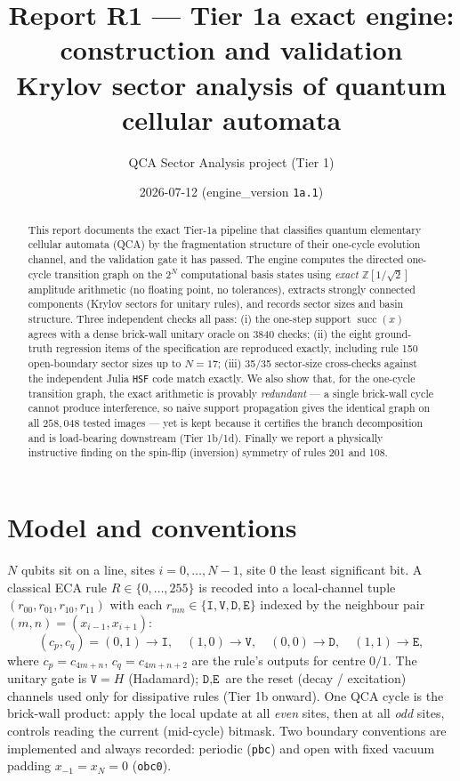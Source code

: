 \documentclass[11pt]{article}
\title{\textbf{Report R1 --- Tier 1a exact engine: construction and validation}\\
\large Krylov sector analysis of quantum cellular automata}
\author{QCA Sector Analysis project (Tier 1)}
\date{2026-07-12 \quad\small(engine\_version \texttt{1a.1})}
\newcommand{\rt}[1]{\texttt{#1}}
\newcommand{\Zsqrt}{\ensuremath{\mathbb{Z}[1/\sqrt{2}]}}
\begin{document}
\maketitle

\begin{abstract}
This report documents the exact Tier-1a pipeline that classifies quantum
elementary cellular automata (QCA) by the fragmentation structure of their
one-cycle evolution channel, and the validation gate it has passed. The engine
computes the directed one-cycle transition graph on the $2^N$ computational
basis states using \emph{exact} \Zsqrt{} amplitude arithmetic (no floating point,
no tolerances), extracts strongly connected components (Krylov sectors for
unitary rules), and records sector sizes and basin structure. Three independent
checks all pass: (i) the one-step support $\operatorname{succ}(x)$ agrees with a
dense brick-wall unitary oracle on 3840 checks; (ii) the eight ground-truth
regression items of the specification are reproduced exactly, including rule 150
open-boundary sector sizes up to $N=17$; (iii) 35/35 sector-size cross-checks
against the independent Julia \rt{HSF} code match exactly. We also show that, for the one-cycle transition
graph, the exact arithmetic is provably \emph{redundant} --- a single brick-wall
cycle cannot produce interference, so naive support propagation gives the
identical graph on all $258{,}048$ tested images --- yet is kept because it
certifies the branch decomposition and is load-bearing downstream (Tier 1b/1d).
Finally we report a physically instructive finding on the spin-flip (inversion)
symmetry of rules 201 and 108.
\end{abstract}

\section{Model and conventions}
$N$ qubits sit on a line, sites $i=0,\dots,N-1$, site $0$ the least significant
bit. A classical ECA rule $R\in\{0,\dots,255\}$ is recoded into a local-channel
tuple $(r_{00},r_{01},r_{10},r_{11})$ with each $r_{mn}\in\{\rt I,\rt V,\rt D,
\rt E\}$ indexed by the neighbour pair $(m,n)=(x_{i-1},x_{i+1})$:
\[
(c_p,c_q)=(0,1)\to\rt I,\quad (1,0)\to\rt V,\quad (0,0)\to\rt D,\quad (1,1)\to\rt E,
\]
where $c_p=c_{4m+n}$, $c_q=c_{4m+n+2}$ are the rule's outputs for centre $0/1$.
The unitary gate is $\rt V=H$ (Hadamard); $\rt D,\rt E$ are the reset (decay /
excitation) channels used only for dissipative rules (Tier 1b onward). One QCA
cycle is the brick-wall product: apply the local update at all \emph{even} sites,
then at all \emph{odd} sites, controls reading the current (mid-cycle) bitmask.
Two boundary conventions are implemented and always recorded: periodic
(\rt{pbc}) and open with fixed vacuum padding $x_{-1}=x_N=0$ (\rt{obc0}).
\end{document}
